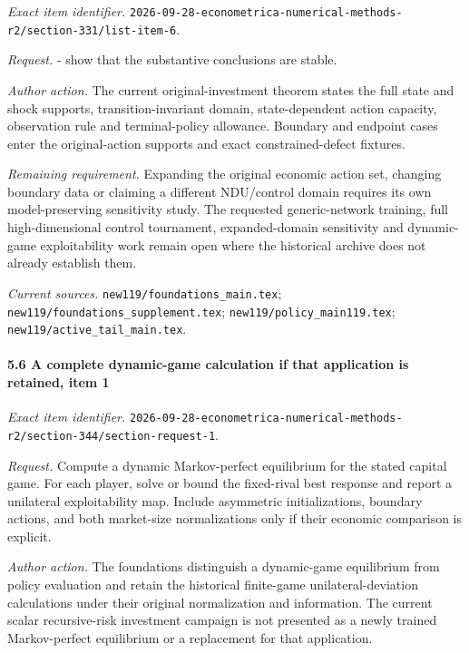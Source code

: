 \emph{Exact item identifier.} \nolinkurl{2026-09-28-econometrica-numerical-methods-r2/section-331/list-item-6}.

\par\emph{Request.} - show that the substantive conclusions are stable.

\par\emph{Author action.} The current original-investment theorem states the full state and shock supports, transition-invariant domain, state-dependent action capacity, observation rule and terminal-policy allowance. Boundary and endpoint cases enter the original-action supports and exact constrained-defect fixtures.

\par\emph{Remaining requirement.} Expanding the original economic action set, changing boundary data or claiming a different NDU/\allowbreak{}control domain requires its own model-preserving sensitivity study. The requested generic-network training, full high-dimensional control tournament, expanded-domain sensitivity and dynamic-game exploitability work remain open where the historical archive does not already establish them.

\par\emph{Current sources.} \nolinkurl{new119/foundations_main.tex}; \nolinkurl{new119/foundations_supplement.tex}; \nolinkurl{new119/policy_main119.tex}; \nolinkurl{new119/active_tail_main.tex}.

\paragraph{5.6 A complete dynamic-game calculation if that application is retained, item 1}

\emph{Exact item identifier.} \nolinkurl{2026-09-28-econometrica-numerical-methods-r2/section-344/section-request-1}.

\par\emph{Request.} Compute a dynamic Markov-perfect equilibrium for the stated capital game. For each player, solve or bound the fixed-rival best response and report a unilateral exploitability map. Include asymmetric initializations, boundary actions, and both market-size normalizations only if their economic comparison is explicit.

\par\emph{Author action.} The foundations distinguish a dynamic-game equilibrium from policy evaluation and retain the historical finite-game unilateral-deviation calculations under their original normalization and information. The current scalar recursive-risk investment campaign is not presented as a newly trained Markov-perfect equilibrium or a replacement for that application.

